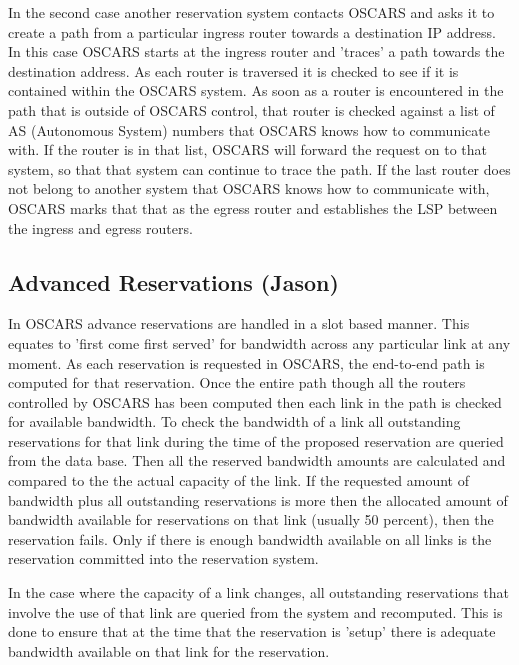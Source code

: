 \documentclass[conference]{IEEEtran}
\begin{document}
In the second case another reservation system contacts OSCARS and asks it to
create a path from a particular ingress router towards a destination IP address.
In this case OSCARS starts at the ingress router and 'traces' a path towards the
destination address. As each router is traversed it is checked to see if it is
contained within the OSCARS system. As soon as a router is encountered in the
path that is outside of OSCARS control, that router is checked against a list of
AS (Autonomous System) numbers that OSCARS knows how to communicate with. If the
router is in that list, OSCARS will forward the request on to that system, so
that that system can continue to trace the path. If the last router does not
belong to another system that OSCARS knows how to communicate with, OSCARS marks
that that as the egress router and establishes the LSP between the ingress and
egress routers.

\subsection{Advanced Reservations (Jason)}
In OSCARS advance reservations are handled in a slot based manner. This equates
to 'first come first served' for bandwidth across any particular link at any
moment. As each reservation is requested in OSCARS, the end-to-end path is
computed for that reservation. Once the entire path though all the routers
controlled by OSCARS has been computed then each link in the path is checked for
available bandwidth. To check the bandwidth of a link all outstanding
reservations for that link during the time of the proposed reservation are
queried from the data base. Then all the reserved bandwidth amounts are
calculated and compared to the the actual capacity of the link. If the requested
amount of bandwidth plus all outstanding reservations is more then the allocated
amount of bandwidth available for reservations on that link (usually
50 percent), then the reservation fails. Only if there is enough bandwidth 
available on all links is the reservation committed into the reservation system.

In the case where the capacity of a link changes, all outstanding reservations
that involve the use of that link are queried from the system and recomputed.
This is done to ensure that at the time that the reservation is 'setup' there
is adequate bandwidth available on that link for the reservation.
\end{document}
